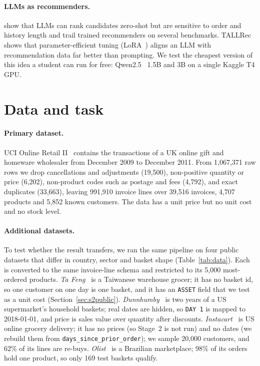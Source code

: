 \documentclass[11pt]{article}
\begin{document}
\paragraph{LLMs as recommenders.}
\citet{hou2024zeroshot} show that LLMs can rank candidates zero-shot but are sensitive to order and history length and trail trained recommenders on several benchmarks.
TALLRec~\citep{bao2023tallrec} shows that parameter-efficient tuning (LoRA~\citep{hu2022lora}) aligns an LLM with recommendation data far better than prompting.
We test the cheapest version of this idea a student can run for free: Qwen2.5~\citep{qwen2025qwen25} 1.5B and 3B on a single Kaggle T4 GPU.

\section{Data and task}

\paragraph{Primary dataset.}
UCI Online Retail II~\citep{chen2019onlineretail,chen2012rfm} contains the transactions of a UK online gift and homeware wholesaler from December 2009 to December 2011.
From 1,067,371 raw rows we drop cancellations and adjustments (19,500), non-positive quantity or price (6,202), non-product codes such as postage and fees (4,792), and exact duplicates (33,663), leaving 991,910 invoice lines over 39,516 invoices, 4,707 products and 5,852 known customers.
The data has a unit price but no unit cost and no stock level.

\paragraph{Additional datasets.}
To test whether the result transfers, we ran the same pipeline on four public datasets that differ in country, sector and basket shape (Table~\ref{tab:data}).
Each is converted to the same invoice-line schema and restricted to its 5,000 most-ordered products.
\emph{Ta Feng}~\citep{tafeng2001} is a Taiwanese warehouse grocer; it has no basket id, so one customer on one day is one basket, and it has an \texttt{ASSET} field that we test as a unit cost (Section~\ref{sec:s2public}).
\emph{Dunnhumby}~\citep{dunnhumby2014journey} is two years of a US supermarket's household baskets; real dates are hidden, so \texttt{DAY 1} is mapped to 2018-01-01, and price is sales value over quantity after discounts.
\emph{Instacart}~\citep{instacart2017} is US online grocery delivery; it has no prices (so Stage~2 is not run) and no dates (we rebuild them from \texttt{days\_since\_prior\_order}); we sample 20,000 customers, and 62\% of its lines are re-buys.
\emph{Olist}~\citep{olist2018} is a Brazilian marketplace; 98\% of its orders hold one product, so only 169 test baskets qualify.
\end{document}
